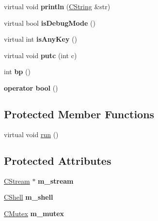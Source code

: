 \begin{DoxyCompactItemize}
\item 
\hypertarget{class_c_debug_ae83e3ecc41e21c19d2cfbea15459a7c9}{virtual void {\bfseries println} (\hyperlink{class_c_string}{C\-String} \&str)}\label{class_c_debug_ae83e3ecc41e21c19d2cfbea15459a7c9}

\item 
\hypertarget{class_c_debug_ab90cf9f4b16af5e740ac6a503f612224}{virtual bool {\bfseries is\-Debug\-Mode} ()}\label{class_c_debug_ab90cf9f4b16af5e740ac6a503f612224}

\item 
\hypertarget{class_c_debug_ad4b4b7f29bf53500532e00aabb62deab}{virtual int {\bfseries is\-Any\-Key} ()}\label{class_c_debug_ad4b4b7f29bf53500532e00aabb62deab}

\item 
\hypertarget{class_c_debug_a8135b97d1fbae13f5a4952e3bbf50d34}{virtual void {\bfseries putc} (int c)}\label{class_c_debug_a8135b97d1fbae13f5a4952e3bbf50d34}

\item 
\hypertarget{class_c_debug_a3c07626045ffa3227794e7cc080f5e36}{int {\bfseries bp} ()}\label{class_c_debug_a3c07626045ffa3227794e7cc080f5e36}

\item 
\hypertarget{class_c_debug_a5a1359725fca8337c5967a3c1811c460}{{\bfseries operator bool} ()}\label{class_c_debug_a5a1359725fca8337c5967a3c1811c460}

\end{DoxyCompactItemize}
\subsection*{Protected Member Functions}
\begin{DoxyCompactItemize}
\item 
virtual void \hyperlink{class_c_debug_a9a3e40cc8ee5d0c2a41577f658779c71}{run} ()
\end{DoxyCompactItemize}
\subsection*{Protected Attributes}
\begin{DoxyCompactItemize}
\item 
\hypertarget{class_c_debug_ab0e3c0c44f27c27a9fafa30866854cbe}{\hyperlink{class_c_stream}{C\-Stream} $\ast$ {\bfseries m\-\_\-stream}}\label{class_c_debug_ab0e3c0c44f27c27a9fafa30866854cbe}

\item 
\hypertarget{class_c_debug_a1e4ada8bb77d3cbcfaf614f0a657d6c7}{\hyperlink{class_c_shell}{C\-Shell} {\bfseries m\-\_\-shell}}\label{class_c_debug_a1e4ada8bb77d3cbcfaf614f0a657d6c7}

\item 
\hypertarget{class_c_debug_a5c8a50a383cc0f5ddd26efb72d6b4794}{\hyperlink{class_c_mutex}{C\-Mutex} {\bfseries m\-\_\-mutex}}\label{class_c_debug_a5c8a50a383cc0f5ddd26efb72d6b4794}

\end{DoxyCompactItemize}

